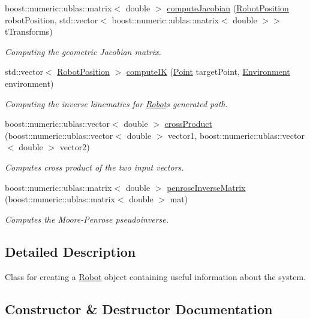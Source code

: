 \begin{DoxyCompactItemize}
boost\+::numeric\+::ublas\+::matrix$<$ double $>$ \hyperlink{classRobot_ade66f279e45e0baeb83ed1b11076819a}{compute\+Jacobian} (\hyperlink{classRobotPosition}{Robot\+Position} robot\+Position, std\+::vector$<$ boost\+::numeric\+::ublas\+::matrix$<$ double $>$$>$ t\+Transforms)
\begin{DoxyCompactList}\small\item\em Computing the geometric Jacobian matrix. \end{DoxyCompactList}\item 
std\+::vector$<$ \hyperlink{classRobotPosition}{Robot\+Position} $>$ \hyperlink{classRobot_a9106cabf9fc8dbd3331c7730c26f1167}{compute\+IK} (\hyperlink{classPoint}{Point} target\+Point, \hyperlink{classEnvironment}{Environment} environment)
\begin{DoxyCompactList}\small\item\em Computing the inverse kinematics for \hyperlink{classRobot}{Robot}\textquotesingle{}s generated path. \end{DoxyCompactList}\item 
boost\+::numeric\+::ublas\+::vector$<$ double $>$ \hyperlink{classRobot_a8ab2ca7f55b9971e8077a925ed12f266}{cross\+Product} (boost\+::numeric\+::ublas\+::vector$<$ double $>$ vector1, boost\+::numeric\+::ublas\+::vector$<$ double $>$ vector2)
\begin{DoxyCompactList}\small\item\em Computes cross product of the two input vectors. \end{DoxyCompactList}\item 
boost\+::numeric\+::ublas\+::matrix$<$ double $>$ \hyperlink{classRobot_a0ab556c3912a69115b3cac81feda7b29}{penrose\+Inverse\+Matrix} (boost\+::numeric\+::ublas\+::matrix$<$ double $>$ mat)
\begin{DoxyCompactList}\small\item\em Computes the Moore-\/\+Penrose pseudoinverse. \end{DoxyCompactList}\end{DoxyCompactItemize}


\subsection{Detailed Description}
Class for creating a \hyperlink{classRobot}{Robot} object containing useful information about the system. 

\subsection{Constructor \& Destructor Documentation}
